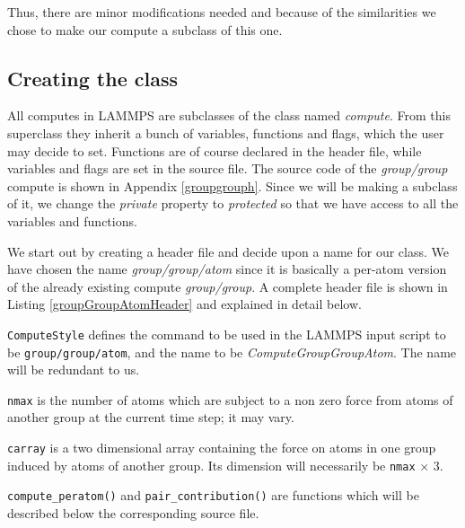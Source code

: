 \documentclass[twoside,english]{uiofysmaster}
\begin{document}
Thus, there are minor modifications needed and because of the similarities we chose to make our compute a subclass of this one.


\subsection{Creating the class}
All computes in LAMMPS are subclasses of the class named  \textit{compute}. From this superclass they inherit a bunch of variables, functions and flags, which the user may decide to set. Functions are of course declared in the header file, while variables and flags are set in the source file. The source code of the \textit{group/group} compute is shown in Appendix \ref{groupgrouph}. Since we will be making a subclass of it, we change the \textit{private} property to \textit{protected} so that we have access to all the variables and functions.

We start out by creating a header file and decide upon a name for our class. We have chosen the name \textit{group/group/atom} since it is basically a per-atom version of the already existing compute \textit{group/group}. A complete header file is shown in Listing \ref{groupGroupAtomHeader} and explained in detail below.



\texttt{ComputeStyle} defines the command to be used in the LAMMPS input script to be \texttt{group/group/atom}, and the name to be \textit{ComputeGroupGroupAtom}. The name will be redundant to us. 

\texttt{nmax} is the number of atoms which are subject to a non zero force from atoms of another group at the current time step; it may vary.

\texttt{carray} is a two dimensional array containing the force on atoms in one group induced by atoms of another group. Its dimension will necessarily be \texttt{nmax} $\times$ 3.

\texttt{compute\_peratom()} and \texttt{pair\_contribution()} are functions which will be described below the corresponding source file. 




\end{document}
